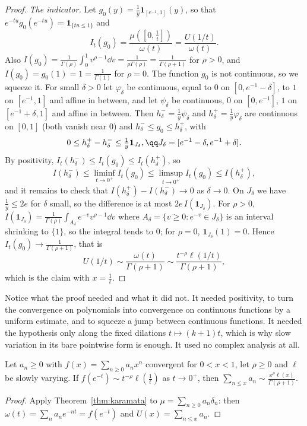 \begin{proof}
\emph{The indicator.} Let $g_0(y)=\frac1y\mathbf 1_{[e^{-1},1]}(y)$, so that $e^{-tu}g_0(e^{-tu})=\mathbf 1_{\{tu\le1\}}$ and
\[
I_t(g_0)=\frac{\mu([0,\frac1t])}{\omega(t)}=\frac{U(1/t)}{\omega(t)}.
\]
Also $I(g_0)=\frac1{\Gamma(\rho)}\int_0^1v^{\rho-1}\dd v=\frac1{\rho\Gamma(\rho)}=\frac1{\Gamma(\rho+1)}$ for $\rho>0$, and $I(g_0)=g_0(1)=1=\frac1{\Gamma(1)}$ for $\rho=0$. The function
$g_0$ is not continuous, so we squeeze it. For small $\delta>0$ let $\varphi_\delta$ be continuous, equal to $0$ on $[0,e^{-1}-\delta]$, to $1$ on $[e^{-1},1]$ and affine in
between, and let $\psi_\delta$ be continuous, $0$ on $[0,e^{-1}]$, $1$ on $[e^{-1}+\delta,1]$ and affine in between. Then $h^-_\delta=\frac1y\psi_\delta$ and $h^+_\delta=\frac1y\varphi_\delta$ are
continuous on $[0,1]$ (both vanish near $0$) and $h^-_\delta\le g_0\le h^+_\delta$, with
\[
0\le h^+_\delta-h^-_\delta\le\tfrac1y\mathbf 1_{J_\delta},\qq J_\delta=[e^{-1}-\delta,e^{-1}+\delta].
\]
By positivity, $I_t(h^-_\delta)\le I_t(g_0)\le I_t(h^+_\delta)$, so
\[
I(h^-_\delta)\le\liminf_{t\to0^+}I_t(g_0)\le\limsup_{t\to0^+}I_t(g_0)\le I(h^+_\delta),
\]
and it remains to check that $I(h^+_\delta)-I(h^-_\delta)\to0$ as $\delta\to0$. On $J_\delta$ we have $\frac1y\le2e$ for $\delta$ small, so the difference is at most
$2e\,I(\mathbf 1_{J_\delta})$. For $\rho>0$, $I(\mathbf 1_{J_\delta})=\frac1{\Gamma(\rho)}\int_{A_\delta}e^{-v}v^{\rho-1}\dd v$ where $A_\delta=\{v\ge0:e^{-v}\in J_\delta\}$ is an interval shrinking to
$\{1\}$, so the integral tends to $0$; for $\rho=0$, $\mathbf 1_{J_\delta}(1)=0$. Hence $I_t(g_0)\to\frac1{\Gamma(\rho+1)}$, that is
\[
U(1/t)\sim\frac{\omega(t)}{\Gamma(\rho+1)}\sim\frac{t^{-\rho}\ell(1/t)}{\Gamma(\rho+1)},
\]
which is the claim with $x=\frac1t$.
\end{proof}

Notice what the proof needed and what it did not. It needed positivity, to turn the convergence on polynomials into convergence on continuous functions by
a uniform estimate, and to squeeze a jump between continuous functions. It needed the hypothesis only along the fixed dilations $t\mapsto(k+1)t$, which is why
slow variation in its bare pointwise form is enough. It used no complex analysis at all.

\begin{corollary}\label{cor:karamataseries}
Let $a_n\ge0$ with $f(x)=\sum_{n\ge0}a_nx^n$ convergent for $0<x<1$, let $\rho\ge0$ and $\ell$ be slowly varying. If $f(e^{-t})\sim t^{-\rho}\ell(\frac1t)$ as
$t\to0^+$, then $\sum_{n\le x}a_n\sim\frac{x^\rho\ell(x)}{\Gamma(\rho+1)}$.
\end{corollary}
\begin{proof}
Apply Theorem~\ref{thm:karamata} to $\mu=\sum_{n\ge0}a_n\delta_n$: then $\omega(t)=\sum_na_ne^{-nt}=f(e^{-t})$ and $U(x)=\sum_{n\le x}a_n$.
\end{proof}

